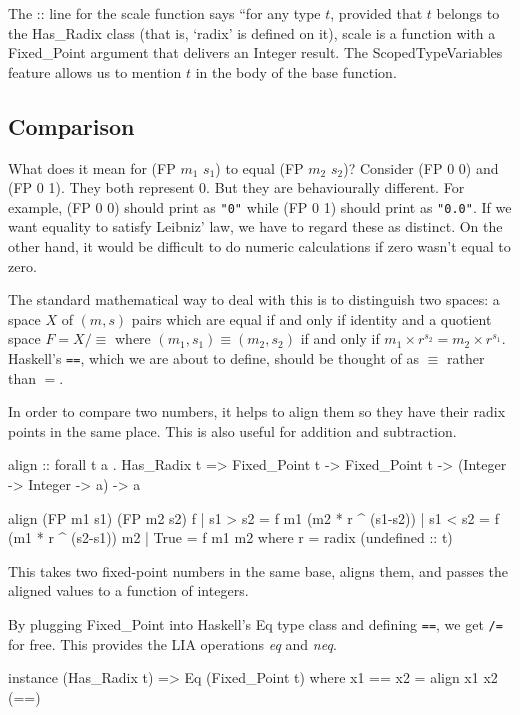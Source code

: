 \documentclass{article}
\begin{document}
The :: line for the scale function says ``for any type $t$,
provided that $t$ belongs to the Has\_Radix class (that is,
`radix' is defined on it), scale is a function with a
Fixed\_Point argument that delivers an Integer result.
The ScopedTypeVariables feature allows us to mention $t$ in
the body of the base function.

\subsection{Comparison}

What does it mean for (FP $m_1$ $s_1$) to equal (FP $m_2$ $s_2$)?
Consider (FP 0 0) and (FP 0 1).  They both represent 0.  But they
are behaviourally different.  For example, (FP 0 0) should print
as \verb|"0"| while (FP 0 1) should print as \verb|"0.0"|.  If we
want equality to satisfy Leibniz' law, we have to regard these as
distinct.  On the other hand, it would be difficult to do numeric
calculations if zero wasn't equal to zero.

The standard mathematical way to deal with this is to distinguish
two spaces:  a space $X$ of $(m,s)$ pairs which are equal if and
only if identity and a quotient space $F = X/\equiv$ where
$(m_1,s_1) \equiv (m_2,s_2)$ if and only if $m_1\times r^{s_2} =
m_2 \times r^{s_1}$.  Haskell's \verb|==|, which we are about to
define, should be thought of as $\equiv$ rather than $=$.

In order to compare two numbers, it helps to align them so they
have their radix points in the same place.  This is also useful
for addition and subtraction.

\begin{code}
align :: forall t a . Has_Radix t =>
    Fixed_Point t -> Fixed_Point t -> (Integer -> Integer -> a) -> a

align (FP m1 s1) (FP m2 s2) f
  | s1 > s2 = f m1 (m2 * r ^ (s1-s2))
  | s1 < s2 = f (m1 * r ^ (s2-s1)) m2
  | True    = f m1 m2
  where r = radix (undefined :: t)
\end{code}

This takes two fixed-point numbers in the same base, aligns them,
and passes the aligned values to a function of integers.

By plugging Fixed\_Point into Haskell's Eq type class and
defining \verb|==|, we get \verb|/=| for free.  This provides
the LIA operations {\it eq} and {\it neq}.

\begin{code}
instance (Has_Radix t) => Eq (Fixed_Point t)
  where x1 == x2 = align x1 x2 (==)
\end{code}
\end{document}
